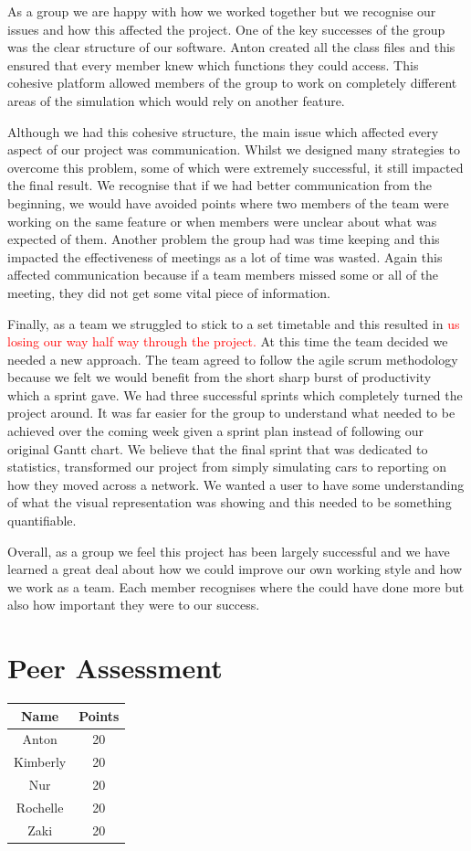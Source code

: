 \documentclass{article}
\begin{document}
	As a group we are happy with how we worked together but we recognise our issues and how this affected the project. One of the key successes of the group was the clear structure of our software. Anton created all the class files and this ensured that every member knew which functions they could access. This cohesive platform allowed members of the group to work on completely different areas of the simulation which would rely on another feature.
	
	 Although we had this cohesive structure, the main issue which affected every aspect of our project was communication. Whilst we designed many strategies to overcome this problem, some of which were extremely successful, it still impacted the final result. We recognise that if we had better communication from the beginning, we would have avoided points where two members of the team were working on the same feature or when members were unclear about what was expected of them. Another problem the group had was time keeping and this impacted the effectiveness of meetings as a lot of time was wasted. Again this affected communication because if a team members missed some or all of the meeting, they did not get some vital piece of information.   
	 
	 Finally, as a team we struggled to stick to a set timetable and this resulted in \textcolor{red}{us losing our way half way through the project.} At this time the team decided we needed a new approach. The team agreed to follow the agile scrum methodology because we felt we would benefit from the short sharp burst of productivity which a sprint gave. We had three successful sprints which completely turned the project around. It was far easier for the group to understand what needed to be achieved over the coming week given a sprint plan instead of following our original Gantt chart. We believe that the final sprint that was dedicated to statistics, transformed our project from simply simulating cars to reporting on how they moved across a network. We wanted a user to have some understanding of what the visual representation was showing and this needed to be something quantifiable. 
	 
	 Overall, as a group we feel this project has been largely successful and we have learned a great deal about how we could improve our own working style and how we work as a team. Each member recognises where the could have done more but also how important they were to our success. 
	
	
	
	
	\section{Peer Assessment}
	\begin{tabular}{|c|c|}
		\hline {\bf Name} & {\bf Points} \\ 
		\hline Anton & 20 \\ 
		\hline Kimberly & 20 \\ 
		\hline Nur & 20 \\ 
		\hline Rochelle & 20 \\ 
		\hline  Zaki & 20 \\ 
		\hline 
	\end{tabular} 
	
	
	
	
	
\end{document}
